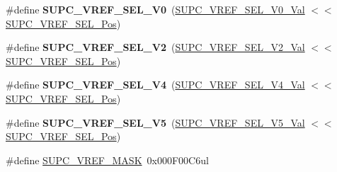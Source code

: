 \begin{DoxyCompactItemize}
\item 
\hypertarget{group___s_a_m_l21___s_u_p_c_gaabb430c9f532d25e4e1eda0df48ea755}{}\#define {\bfseries S\+U\+P\+C\+\_\+\+V\+R\+E\+F\+\_\+\+S\+E\+L\+\_\+V0}~(\hyperlink{group___s_a_m_l21___s_u_p_c_gae0d754e14d6933674da87fcce4943a05}{S\+U\+P\+C\+\_\+\+V\+R\+E\+F\+\_\+\+S\+E\+L\+\_\+V0\+\_\+\+Val}         $<$$<$ \hyperlink{group___s_a_m_l21___s_u_p_c_gad4360a3a50810b54b6e54cc7685f7cf5}{S\+U\+P\+C\+\_\+\+V\+R\+E\+F\+\_\+\+S\+E\+L\+\_\+\+Pos})\label{group___s_a_m_l21___s_u_p_c_gaabb430c9f532d25e4e1eda0df48ea755}

\item 
\hypertarget{group___s_a_m_l21___s_u_p_c_ga64bcc935f96e91376c1d2c34307b037a}{}\#define {\bfseries S\+U\+P\+C\+\_\+\+V\+R\+E\+F\+\_\+\+S\+E\+L\+\_\+V2}~(\hyperlink{group___s_a_m_l21___s_u_p_c_ga940bdd6d316685f44a2fdea57ec06829}{S\+U\+P\+C\+\_\+\+V\+R\+E\+F\+\_\+\+S\+E\+L\+\_\+V2\+\_\+\+Val}         $<$$<$ \hyperlink{group___s_a_m_l21___s_u_p_c_gad4360a3a50810b54b6e54cc7685f7cf5}{S\+U\+P\+C\+\_\+\+V\+R\+E\+F\+\_\+\+S\+E\+L\+\_\+\+Pos})\label{group___s_a_m_l21___s_u_p_c_ga64bcc935f96e91376c1d2c34307b037a}

\item 
\hypertarget{group___s_a_m_l21___s_u_p_c_ga7d22da3388a0aa3c120468fc0bb8e3ed}{}\#define {\bfseries S\+U\+P\+C\+\_\+\+V\+R\+E\+F\+\_\+\+S\+E\+L\+\_\+V4}~(\hyperlink{group___s_a_m_l21___s_u_p_c_gaa7e78450b8097200c0b04af2bb712e72}{S\+U\+P\+C\+\_\+\+V\+R\+E\+F\+\_\+\+S\+E\+L\+\_\+V4\+\_\+\+Val}         $<$$<$ \hyperlink{group___s_a_m_l21___s_u_p_c_gad4360a3a50810b54b6e54cc7685f7cf5}{S\+U\+P\+C\+\_\+\+V\+R\+E\+F\+\_\+\+S\+E\+L\+\_\+\+Pos})\label{group___s_a_m_l21___s_u_p_c_ga7d22da3388a0aa3c120468fc0bb8e3ed}

\item 
\hypertarget{group___s_a_m_l21___s_u_p_c_ga8c318784e614cf739a8499283fbbf2c2}{}\#define {\bfseries S\+U\+P\+C\+\_\+\+V\+R\+E\+F\+\_\+\+S\+E\+L\+\_\+V5}~(\hyperlink{group___s_a_m_l21___s_u_p_c_ga55e502a549ceeb45df2dcae2250a9007}{S\+U\+P\+C\+\_\+\+V\+R\+E\+F\+\_\+\+S\+E\+L\+\_\+V5\+\_\+\+Val}         $<$$<$ \hyperlink{group___s_a_m_l21___s_u_p_c_gad4360a3a50810b54b6e54cc7685f7cf5}{S\+U\+P\+C\+\_\+\+V\+R\+E\+F\+\_\+\+S\+E\+L\+\_\+\+Pos})\label{group___s_a_m_l21___s_u_p_c_ga8c318784e614cf739a8499283fbbf2c2}

\item 
\hypertarget{group___s_a_m_l21___s_u_p_c_gae86e359610418b463f43b71c7e206645}{}\#define \hyperlink{group___s_a_m_l21___s_u_p_c_gae86e359610418b463f43b71c7e206645}{S\+U\+P\+C\+\_\+\+V\+R\+E\+F\+\_\+\+M\+A\+S\+K}~0x000\+F00\+C6ul\label{group___s_a_m_l21___s_u_p_c_gae86e359610418b463f43b71c7e206645}


\end{DoxyCompactItemize}
